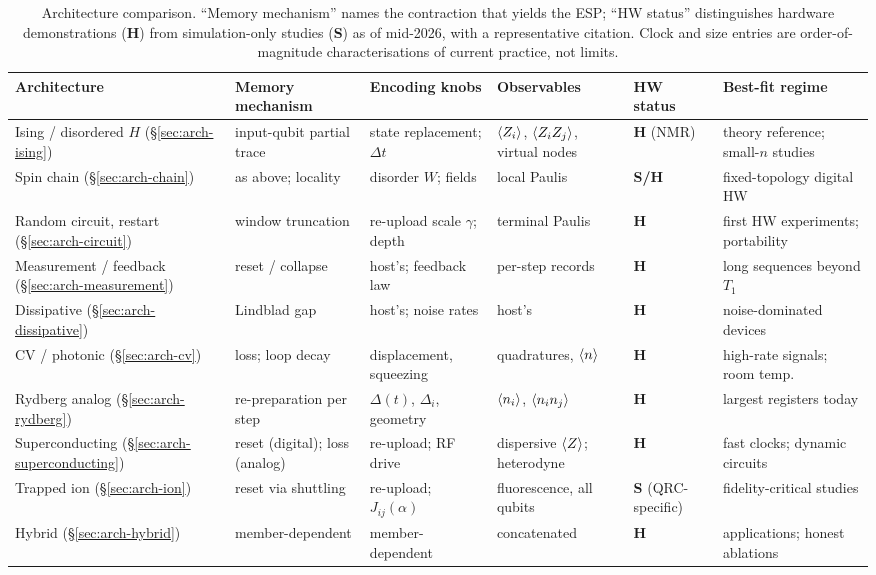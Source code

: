 \begin{table}[tp]
\centering\small
\caption{Architecture comparison. ``Memory mechanism'' names the contraction
that yields the ESP; ``HW status'' distinguishes hardware demonstrations
(\textbf{H}) from simulation-only studies (\textbf{S}) as of mid-2026, with a
representative citation. Clock and size entries are order-of-magnitude
characterisations of current practice, not limits.}
\label{tab:arch-compare}
\begin{tabular}{@{}p{2.6cm}p{2.5cm}p{2.4cm}p{2.2cm}p{1.9cm}p{2.6cm}@{}}
\toprule
Architecture & Memory mechanism & Encoding knobs & Observables & HW status & Best-fit regime \\
\midrule
Ising / disordered $H$ (\S\ref{sec:arch-ising}) & input-qubit partial trace & state replacement; $\Delta t$ & $\langle Z_i\rangle$, $\langle Z_iZ_j\rangle$, virtual nodes & \textbf{H} (NMR) \citep{negoro2018machine} & theory reference; small-$n$ studies \\
Spin chain (\S\ref{sec:arch-chain}) & as above; locality & disorder $W$; fields & local Paulis & \textbf{S/H} \citep{martinez2021dynamical} & fixed-topology digital HW \\
Random circuit, restart (\S\ref{sec:arch-circuit}) & window truncation & re-upload scale $\gamma$; depth & terminal Paulis & \textbf{H} \citep{chen2020temporal} & first HW experiments; portability \\
Measurement / feedback (\S\ref{sec:arch-measurement}) & reset / collapse & host's; feedback law & per-step records & \textbf{H} \citep{hu2024overcoming} & long sequences beyond $T_1$ \\
Dissipative (\S\ref{sec:arch-dissipative}) & Lindblad gap & host's; noise rates & host's & \textbf{H} \citep{suzuki2022natural} & noise-dominated devices \\
CV / photonic (\S\ref{sec:arch-cv}) & loss; loop decay & displacement, squeezing & quadratures, $\langle n\rangle$ & \textbf{H} \citep{paparelle2025experimental,cimini2025gaussian} & high-rate signals; room temp.\ \\
Rydberg analog (\S\ref{sec:arch-rydberg}) & re-preparation per step & $\Delta(t)$, $\Delta_i$, geometry & $\langle n_i\rangle$, $\langle n_in_j\rangle$ & \textbf{H} \citep{kornjaca2024large} & largest registers today \\
Superconducting (\S\ref{sec:arch-superconducting}) & reset (digital); loss (analog) & re-upload; RF drive & dispersive $\langle Z\rangle$; heterodyne & \textbf{H} \citep{senanian2024microwave,yasuda2023quantum} & fast clocks; dynamic circuits \\
Trapped ion (\S\ref{sec:arch-ion}) & reset via shuttling & re-upload; $J_{ij}(\alpha)$ & fluorescence, all qubits & \textbf{S} (QRC-specific) & fidelity-critical studies \\
Hybrid (\S\ref{sec:arch-hybrid}) & member-dependent & member-dependent & concatenated & \textbf{H} \citep{pfeffer2022hybrid,settino2025memory} & applications; honest ablations \\
\bottomrule
\end{tabular}
\end{table}

